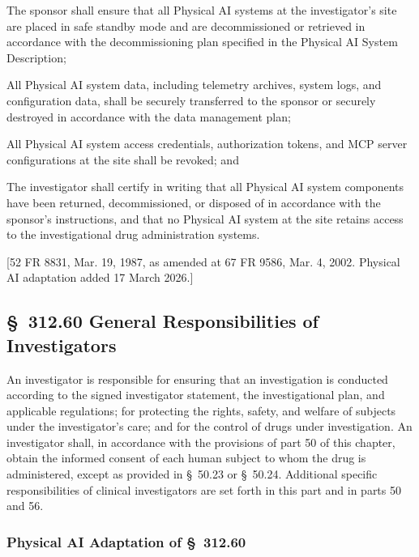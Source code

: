 \documentclass[11pt]{article}
\begin{document}
\begin{description}[leftmargin=0.8cm,style=sameline]
\item[(a)] The sponsor shall ensure that all Physical AI systems at the investigator's site are placed in safe standby mode and are decommissioned or retrieved in accordance with the decommissioning plan specified in the Physical AI System Description;
\item[(b)] All Physical AI system data, including telemetry archives, system logs, and configuration data, shall be securely transferred to the sponsor or securely destroyed in accordance with the data management plan;
\item[(c)] All Physical AI system access credentials, authorization tokens, and MCP server configurations at the site shall be revoked; and
\item[(d)] The investigator shall certify in writing that all Physical AI system components have been returned, decommissioned, or disposed of in accordance with the sponsor's instructions, and that no Physical AI system at the site retains access to the investigational drug administration systems.
\end{description}

[52 FR 8831, Mar. 19, 1987, as amended at 67 FR 9586, Mar. 4, 2002. Physical AI adaptation added 17 March 2026.]

\subsection{\S~312.60 General Responsibilities of Investigators}

An investigator is responsible for ensuring that an investigation is conducted according to the signed investigator statement, the investigational plan, and applicable regulations; for protecting the rights, safety, and welfare of subjects under the investigator's care; and for the control of drugs under investigation. An investigator shall, in accordance with the provisions of part 50 of this chapter, obtain the informed consent of each human subject to whom the drug is administered, except as provided in \S~50.23 or \S~50.24. Additional specific responsibilities of clinical investigators are set forth in this part and in parts 50 and 56.

\subsubsection{Physical AI Adaptation of \S~312.60}
\end{document}
